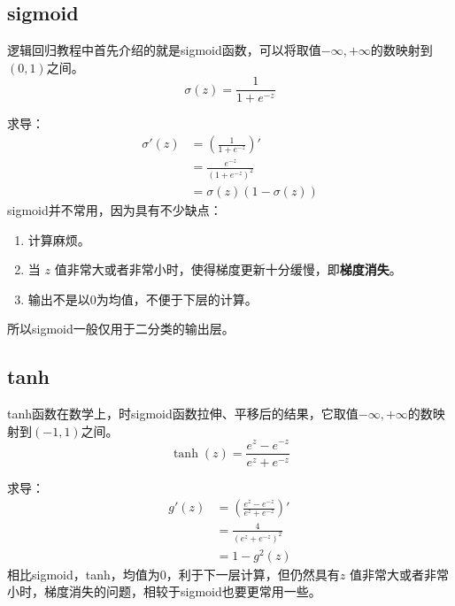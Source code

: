\documentclass[../../main.tex]{subfiles}
\begin{document}
\subsection{sigmoid}
逻辑回归教程中首先介绍的就是sigmoid函数，可以将取值\(-∞, +∞\)的数映射到\((0, 1)\)之间。
\[σ(z) = \frac{1}{1+e^{-z}}\]
\begin{figure}[H]
    \centering
\end{figure}
求导：
\begin{align*}
    σ'(z) & = (\frac{1}{1+e^{-z}})'       \\
          & = \frac{e^{-z}}{(1+e^{-z})^2} \\
          & = σ(z)(1- σ(z))
\end{align*}
sigmoid并不常用，因为具有不少缺点：
\begin{enumerate}
    \item 计算麻烦。
    \item 当 \(z\) 值非常大或者非常小时，使得梯度更新十分缓慢，即\textbf{梯度消失}。
    \item 输出不是以0为均值，不便于下层的计算。
\end{enumerate}
所以sigmoid一般仅用于二分类的输出层。

\subsection{tanh}
tanh函数在数学上，时sigmoid函数拉伸、平移后的结果，它取值\(-∞, +∞\)的数映射到\((-1, 1)\)之间。
\[\tanh(z) = \frac{e^{z}-e^{-z}}{e^{z}+e^{-z}}\]
\begin{figure}[H]
    \centering
\end{figure}
求导：
\begin{align*}
    g'(z) & = (\frac{e^{z}-e^{-z}}{e^{z}+e^{-z}})' \\
          & = \frac{4}{(e^{z}+e^{-z})^2}           \\
          & = 1-g^2(z)
\end{align*}
相比sigmoid，tanh，均值为0，利于下一层计算，但仍然具有\(z\) 值非常大或者非常小时，梯度消失的问题，相较于sigmoid也要更常用一些。
\end{document}
